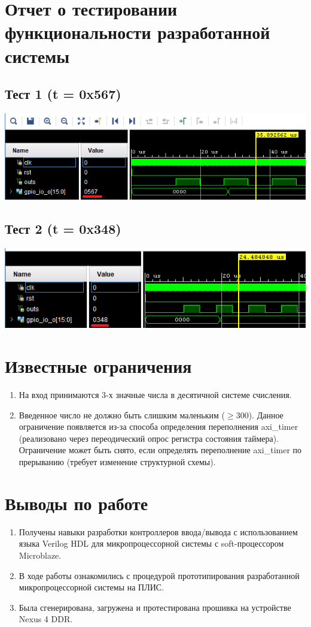 \documentclass[a4paper, 12pt]{article}
\begin{document}
\section{Отчет о тестировании функциональности разработанной системы}
\subsection{Тест 1 (t = 0x567)}
\includegraphics{test1.png}
\subsection{Тест 2 (t = 0x348)}
\includegraphics{test2.png}

\section{Известные ограничения}
\begin{enumerate}
	\item На вход принимаются 3-х значные числа в десятичной системе счисления.
	\item Введенное число не должно быть слишким маленьким ($\geq$300). Данное ограничение появляется из-за способа определения переполнения axi\_timer (реализовано через переодический опрос регистра состояния таймера). Ограничение может быть снято, если определять переполнение axi\_timer по прерыванию (требует изменение структурной схемы).
\end{enumerate}

\section{Выводы по работе}
\begin{enumerate}
\item Получены навыки разработки контроллеров ввода/вывода с использованием языка Verilog HDL для микропроцессорной системы с soft-процессором Microblaze.
\item В ходе работы ознакомились с процедурой прототипирования разработанной микропроцессорной системы на ПЛИС.
\item Была сгенерирована, загружена и протестирована прошивка на устройстве Nexus 4 DDR.
\end{enumerate}
\end{document}
